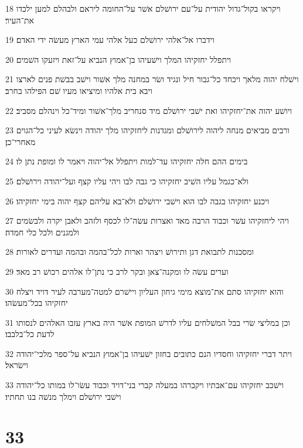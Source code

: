\par 18 ויקראו בקול־גדול יהודית על־עם ירושׁלם אשׁר על־החומה ליראם ולבהלם למען ילכדו את־העיר׃
\par 19 וידברו אל־אלהי ירושׁלם כעל אלהי עמי הארץ מעשׂה ידי האדם׃
\par 20 ויתפלל יחזקיהו המלך וישׁעיהו בן־אמוץ הנביא על־זאת ויזעקו השׁמים׃
\par 21 וישׁלח יהוה מלאך ויכחד כל־גבור חיל ונגיד ושׂר במחנה מלך אשׁור וישׁב בבשׁת פנים לארצו ויבא בית אלהיו ומיציאו מעיו שׁם הפילהו בחרב׃
\par 22 ויושׁע יהוה את־יחזקיהו ואת ישׁבי ירושׁלם מיד סנחריב מלך־אשׁור ומיד־כל וינהלם מסביב׃
\par 23 ורבים מביאים מנחה ליהוה לירושׁלם ומגדנות ליחזקיהו מלך יהודה וינשׂא לעיני כל־הגוים מאחרי־כן׃
\par 24 בימים ההם חלה יחזקיהו עד־למות ויתפלל אל־יהוה ויאמר לו ומופת נתן לו׃
\par 25 ולא־כגמל עליו השׁיב יחזקיהו כי גבה לבו ויהי עליו קצף ועל־יהודה וירושׁלם׃
\par 26 ויכנע יחזקיהו בגבה לבו הוא וישׁבי ירושׁלם ולא־בא עליהם קצף יהוה בימי יחזקיהו׃
\par 27 ויהי ליחזקיהו עשׁר וכבוד הרבה מאד ואצרות עשׂה־לו לכסף ולזהב ולאבן יקרה ולבשׂמים ולמגנים ולכל כלי חמדה׃
\par 28 ומסכנות לתבואת דגן ותירושׁ ויצהר וארות לכל־בהמה ובהמה ועדרים לאורות׃
\par 29 וערים עשׂה לו ומקנה־צאן ובקר לרב כי נתן־לו אלהים רכושׁ רב מאד׃
\par 30 והוא יחזקיהו סתם את־מוצא מימי גיחון העליון ויישׁרם למטה־מערבה לעיר דויד ויצלח יחזקיהו בכל־מעשׂהו׃
\par 31 וכן במליצי שׂרי בבל המשׁלחים עליו לדרשׁ המופת אשׁר היה בארץ עזבו האלהים לנסותו לדעת כל־בלבבו׃
\par 32 ויתר דברי יחזקיהו וחסדיו הנם כתובים בחזון ישׁעיהו בן־אמוץ הנביא על־ספר מלכי־יהודה וישׂראל׃
\par 33 וישׁכב יחזקיהו עם־אבתיו ויקברהו במעלה קברי בני־דויד וכבוד עשׂו־לו במותו כל־יהודה וישׁבי ירושׁלם וימלך מנשׁה בנו תחתיו׃

\chapter{33}

